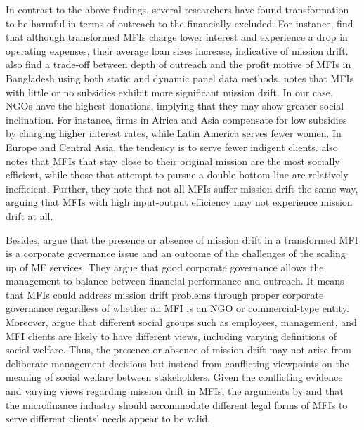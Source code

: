 \documentclass[a4paper, nobind]{templates/ociamthesis}
\begin{document}
In contrast to the above findings, several researchers have found transformation to be harmful in terms of outreach to the financially excluded. For instance, \textcite{d2017ngos} find that although transformed MFIs charge lower interest and experience a drop in operating expenses, their average loan sizes increase, indicative of mission drift. \textcite{mia2017mission} also find a trade-off between depth of outreach and the profit motive of MFIs in Bangladesh using both static and dynamic panel data methods. \textcite{d2013unsubsidized} notes that MFIs with little or no subsidies exhibit more significant mission drift. In our case, NGOs have the highest donations, implying that they may show greater social inclination. For instance, firms in Africa and Asia compensate for low subsidies by charging higher interest rates, while Latin America serves fewer women. In Europe and Central Asia, the tendency is to serve fewer indigent clients. \textcite{bos2015practice} also notes that MFIs that stay close to their original mission are the most socially efficient, while those that attempt to pursue a double bottom line are relatively inefficient. Further, they note that not all MFIs suffer mission drift the same way, arguing that MFIs with high input-output efficiency may not experience mission drift at all.

Besides, \textcite{campion1999institutional} argue that the presence or absence of mission drift in a transformed MFI is a corporate governance issue and an outcome of the challenges of the scaling up of MF services. They argue that good corporate governance allows the management to balance between financial performance and outreach. It means that MFIs could address mission drift problems through proper corporate governance regardless of whether an MFI is an NGO or commercial-type entity. Moreover, \textcite{marti2016financial} argue that different social groups such as employees, management, and MFI clients are likely to have different views, including varying definitions of social welfare. Thus, the presence or absence of mission drift may not arise from deliberate management decisions but instead from conflicting viewpoints on the meaning of social welfare between stakeholders. Given the conflicting evidence and varying views regarding mission drift in MFIs, the arguments by \textcite{morduch1999microfinance} and \textcite{morduch2000microfinance} that the microfinance industry should accommodate different legal forms of MFIs to serve different clients' needs appear to be valid.
\end{document}
